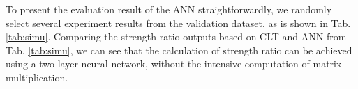 
To present the evaluation result of the ANN straightforwardly, we randomly
select several experiment results from the validation dataset, as is shown
in Tab. \ref{tab:simu}.  Comparing the strength ratio outputs based on CLT and
ANN from Tab. \ref{tab:simu}, we can see that the calculation of strength ratio
can be achieved using a two-layer neural network, without the intensive
computation of matrix multiplication.





